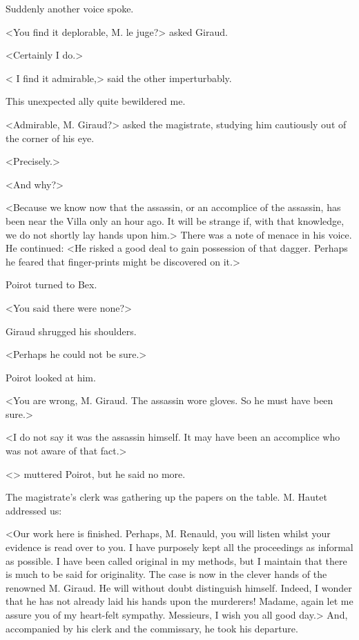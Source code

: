  Suddenly another voice spoke. 

 <You find it deplorable, M. le juge?> asked Giraud. 

 <Certainly I do.> 

 < I find it admirable,> said the other imperturbably. 

 This unexpected ally quite bewildered me. 

 <Admirable, M. Giraud?> asked the magistrate, studying him cautiously out of the corner of his eye. 

 <Precisely.> 

 <And why?> 

 <Because we know now that the assassin, or an accomplice of the assassin, has been near the Villa only an hour ago. It will be strange if, with that knowledge, we do not shortly lay hands upon him.> There was a note of menace in his voice. He continued: <He risked a good deal to gain possession of that dagger. Perhaps he feared that finger-prints might be discovered on it.> 

 Poirot turned to Bex. 

 <You said there were none?> 

 Giraud shrugged his shoulders. 

 <Perhaps he could not be sure.> 

 Poirot looked at him. 

 <You are wrong, M. Giraud. The assassin wore gloves. So he must have been sure.> 

 <I do not say it was the assassin himself. It may have been an accomplice who was not aware of that fact.> 

 <> muttered Poirot, but he said no more. 

 The magistrate's clerk was gathering up the papers on the table. M. Hautet addressed us: 

 <Our work here is finished. Perhaps, M. Renauld, you will listen whilst your evidence is read over to you. I have purposely kept all the proceedings as informal as possible. I have been called original in my methods, but I maintain that there is much to be said for originality. The case is now in the clever hands of the renowned M. Giraud. He will without doubt distinguish himself. Indeed, I wonder that he has not already laid his hands upon the murderers! Madame, again let me assure you of my heart-felt sympathy. Messieurs, I wish you all good day.> And, accompanied by his clerk and the commissary, he took his departure. 

